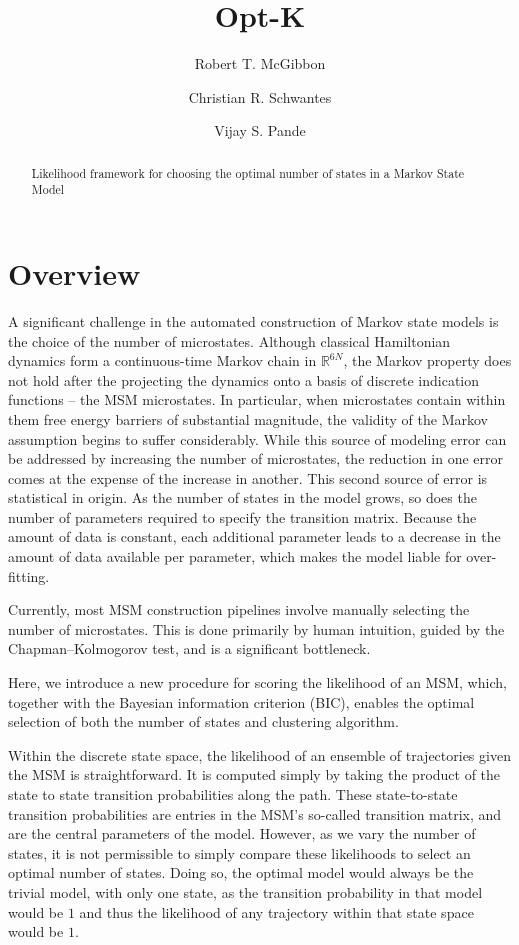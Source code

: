 \documentclass[twocolumn,floatfix,nofootinbib,aps]{revtex4-1}
\begin{document}
\title{Opt-K}
\author{Robert T. McGibbon}
\author{Christian R. Schwantes}
\author{Vijay S. Pande}

\begin{abstract}
Likelihood framework for choosing the optimal number of states in a
Markov State Model
\end{abstract}

\maketitle

\section{Overview}

A significant challenge in the automated construction of Markov state
models is the choice of the number of microstates. Although classical Hamiltonian dynamics form a continuous-time Markov chain in $\mathbb{R}^{6N}$, the Markov property does not hold after the projecting the dynamics onto a basis of discrete indication functions -- the MSM microstates. In particular, when microstates contain within them free energy barriers of substantial magnitude, the validity of the Markov assumption begins to suffer considerably. While this source of modeling error can be addressed by increasing the number of microstates, the reduction in one error comes at the expense of the increase in another. This second source of error is statistical in origin. As the number of states in the model grows, so does the number of parameters required to specify the transition matrix. Because the amount of data is constant, each additional parameter leads to a decrease in the amount of data available per
parameter, which makes the model liable for over-fitting.

Currently, most MSM construction pipelines involve manually selecting the number of microstates. This is done primarily by human intuition, guided by the Chapman–Kolmogorov test, and is a significant bottleneck.

Here, we introduce a new procedure for scoring the likelihood of an MSM, which, together with the Bayesian information criterion (BIC), enables the optimal selection of both the number of states and clustering algorithm.

Within the discrete state space, the likelihood of an ensemble of
trajectories given the MSM is straightforward. It is computed simply by taking the product of the state to state transition probabilities along the path.
These state-to-state transition probabilities are entries in the MSM's so-called transition matrix, and are the central parameters of the model. However, as we vary the number of states, it is not permissible to simply compare these likelihoods to select an optimal number of states. Doing so, the optimal model would always be the trivial model, with only one state, as the transition probability in that model would be $1$ and thus the likelihood of any trajectory within that state space would be $1$.
\end{document}
